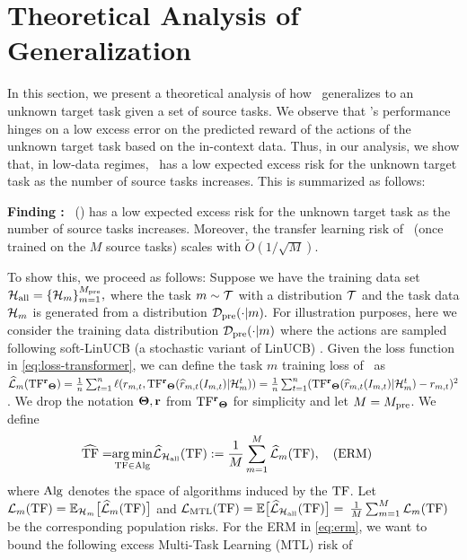 \documentclass[10pt]{article}
\theoremstyle{plain}
\theoremstyle{definition}
\theoremstyle{remark}
\newcounter{findingcounter}
\newcommand{\customfinding}[1][\normalfont]{\stepcounter{findingcounter}\textbf{Finding \thefindingcounter:}#1 }
\begin{document}
\section{Theoretical Analysis of Generalization}
\vspace*{-0.7em}
\label{sec:theory}
In this section, we present a theoretical analysis of how \predt\ generalizes to an unknown target task given a set of source tasks. We observe that \predt's performance hinges on a low excess error on the predicted reward of the actions of the unknown target task based on the in-context data. Thus, in our analysis, we show that, in low-data regimes, \predt\ has a low expected excess risk for the unknown target task as the number of source tasks increases. This is summarized as follows:
\begin{tcolorbox}
\customfinding \pred\ (\gt) has a low expected excess risk for the unknown target task as the number of source tasks increases.  Moreover, the transfer learning risk of \predt\ (once trained on the $M$ source tasks) scales with $\widetilde{O}(1/\sqrt{M})$.
\end{tcolorbox}
To show this, we proceed as follows: Suppose we have the training data set $\mathcal{H}_{\mathrm{all}} = \{\mathcal{H}_m\}_{m=1}^{M_{\text{pre}}},$ where the task $m\sim \mathcal{T}$ with a distribution $\mathcal{T}$ and the task data $\mathcal{H}_m$ is generated from a distribution $ \mathcal{D}_{\text{pre}}(\cdot | m).$
For illustration purposes, here we consider the training data distribution $\mathcal{D}_{\text{pre}}(\cdot | m) $ where the actions are sampled following soft-LinUCB (a stochastic variant of LinUCB) \citep{chu2011contextual}.
Given the loss function in \cref{eq:loss-transformer}, we can define the task $m$ training loss of \predt\ as $\widehat{\mathcal{L}}_m(\mathrm{TF^{\mathbf{r}}}_{\mathbf{\Theta}}) = \frac{1}{n}\sum_{t=1}^n\ell(r_{m,t},\mathrm{TF^{\mathbf{r}}}_{\mathbf{\Theta}}(\widehat{r}_{m,t}(I_{m, t})|\mathcal{H}^t_m)) = \frac{1}{n}\sum_{t=1}^n(\mathrm{TF^{\mathbf{r}}}_{\mathbf{\Theta}}(\widehat{r}_{m,t}(I_{m, t})|\mathcal{H}^t_m) - r_{m,t})^2$. We drop the notation $\mathbf{\Theta}, \mathbf{r}$ from $\mathrm{TF^{\mathbf{r}}}_{\mathbf{\Theta}}$ for simplicity and let $M=M_{\text{pre}}$. We define
\begin{align}
\widehat{\mathrm{TF}}= & \underset{\mathrm{TF} \in \mathrm{Alg}}{\arg \min } \widehat{\mathcal{L}}_{\mathcal{H}_{\mathrm{all}}}(\mathrm{TF}):=\frac{1}{M} \sum_{m=1}^M \widehat{\mathcal{L}}_m(\mathrm{TF}), \quad \text {(ERM)} \label{eq:erm}
\end{align}
where $\mathrm{Alg}$ denotes the space of algorithms induced by the $\mathrm{TF}$.
Let $\mathcal{L}_m(\mathrm{TF})=\mathbb{E}_{\mathcal{H}_m}\big[\widehat{\mathcal{L}}_m(\mathrm{TF})\big]$ and $\mathcal{L}_{\mathrm{MTL}}(\mathrm{TF})=\mathbb{E}\big[\widehat{\mathcal{L}}_{\mathcal{H}_{\mathrm{all }}}(\mathrm{TF})\big]=$ $\frac{1}{M} \sum_{m=1}^M \mathcal{L}_m(\mathrm{TF})$ be the corresponding population risks. For the ERM in \eqref{eq:erm}, we want to bound the following excess Multi-Task Learning (MTL) risk of \predt\
\end{document}
